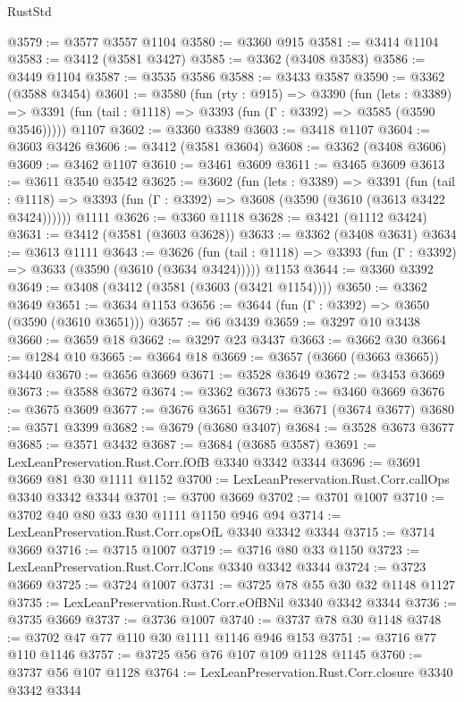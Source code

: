 \begin{lexlean}{RustStd}
\begin{coremodule}
{\begin{coremodule}
{{{{{{{{{{{{{{{{{{{{{{{{{{{{{{{@3579 := @3577 @3557 @1104
@3580 := @3360 @915
@3581 := @3414 @1104
@3583 := @3412 (@3581 @3427)
@3585 := @3362 (@3408 @3583)
@3586 := @3449 @1104
@3587 := @3535 @3586
@3588 := @3433 @3587
@3590 := @3362 (@3588 @3454)
@3601 := @3580
    (fun (rty : @915) =>
    @3390
      (fun (lets : @3389) =>
      @3391 (fun (tail : @1118) => @3393 (fun (Γ : @3392) => @3585 (@3590 @3546)))))
    @1107
@3602 := @3360 @3389
@3603 := @3418 @1107
@3604 := @3603 @3426
@3606 := @3412 (@3581 @3604)
@3608 := @3362 (@3408 @3606)
@3609 := @3462 @1107
@3610 := @3461 @3609
@3611 := @3465 @3609
@3613 := @3611 @3540 @3542
@3625 := @3602
    (fun (lets : @3389) =>
    @3391
      (fun (tail : @1118) => @3393 (fun (Γ : @3392) => @3608 (@3590 (@3610 (@3613 @3422 @3424))))))
    @1111
@3626 := @3360 @1118
@3628 := @3421 (@1112 @3424)
@3631 := @3412 (@3581 (@3603 @3628))
@3633 := @3362 (@3408 @3631)
@3634 := @3613 @1111
@3643 := @3626
    (fun (tail : @1118) => @3393 (fun (Γ : @3392) => @3633 (@3590 (@3610 (@3634 @3424)))))
    @1153
@3644 := @3360 @3392
@3649 := @3408 (@3412 (@3581 (@3603 (@3421 @1154))))
@3650 := @3362 @3649
@3651 := @3634 @1153
@3656 := @3644 (fun (Γ : @3392) => @3650 (@3590 (@3610 @3651)))
@3657 := @6 @3439
@3659 := @3297 @10 @3438
@3660 := @3659 @18
@3662 := @3297 @23 @3437
@3663 := @3662 @30
@3664 := @1284 @10
@3665 := @3664 @18
@3669 := @3657 (@3660 (@3663 @3665)) @3440
@3670 := @3656 @3669
@3671 := @3528 @3649
@3672 := @3453 @3669
@3673 := @3588 @3672
@3674 := @3362 @3673
@3675 := @3460 @3669
@3676 := @3675 @3609
@3677 := @3676 @3651
@3679 := @3671 (@3674 @3677)
@3680 := @3571 @3399
@3682 := @3679 (@3680 @3407)
@3684 := @3528 @3673 @3677
@3685 := @3571 @3432
@3687 := @3684 (@3685 @3587)
@3691 := LexLeanPreservation.Rust.Corr.fOfB @3340 @3342 @3344
@3696 := @3691 @3669 @81 @30 @1111 @1152
@3700 := LexLeanPreservation.Rust.Corr.callOps @3340 @3342 @3344
@3701 := @3700 @3669
@3702 := @3701 @1007
@3710 := @3702 @40 @80 @33 @30 @1111 @1150 @946 @94
@3714 := LexLeanPreservation.Rust.Corr.opsOfL @3340 @3342 @3344
@3715 := @3714 @3669
@3716 := @3715 @1007
@3719 := @3716 @80 @33 @1150
@3723 := LexLeanPreservation.Rust.Corr.lCons @3340 @3342 @3344
@3724 := @3723 @3669
@3725 := @3724 @1007
@3731 := @3725 @78 @55 @30 @32 @1148 @1127
@3735 := LexLeanPreservation.Rust.Corr.eOfBNil @3340 @3342 @3344
@3736 := @3735 @3669
@3737 := @3736 @1007
@3740 := @3737 @78 @30 @1148
@3748 := @3702 @47 @77 @110 @30 @1111 @1146 @946 @153
@3751 := @3716 @77 @110 @1146
@3757 := @3725 @56 @76 @107 @109 @1128 @1145
@3760 := @3737 @56 @107 @1128
@3764 := LexLeanPreservation.Rust.Corr.closure @3340 @3342 @3344
}}}}}}}}}}}}}}}}}}}}}}}}}}}}}}}
\end{coremodule}}
\end{coremodule}
\end{lexlean}
